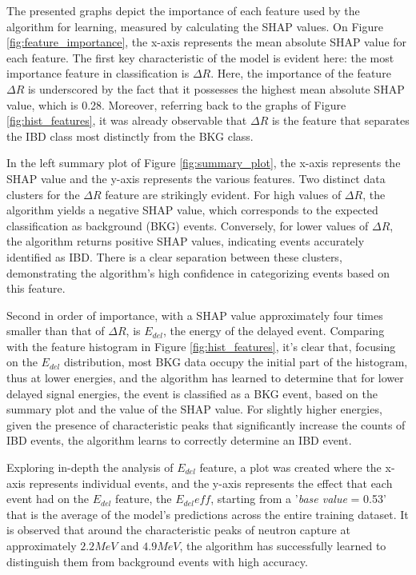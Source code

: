 The presented graphs depict the importance of each feature used by the algorithm for learning, measured by calculating the  SHAP values. On Figure \ref{fig:feature_importance}, the x-axis represents the mean absolute SHAP value for each feature. The first key characteristic of the model is evident here: the  most importance feature in classification is $\Delta R$. Here, the importance of the feature $\Delta R$ is underscored by the fact that it possesses the highest mean absolute SHAP value, which is 0.28. Moreover, referring back to the graphs of Figure \ref{fig:hist_features}, it was already observable that $\Delta R$ is the feature that separates the IBD class most distinctly from the BKG class. %

In the left summary plot of Figure \ref{fig:summary_plot}, the x-axis represents the SHAP value and the y-axis represents the various features. Two distinct data clusters for the \(\Delta R\) feature are strikingly evident. For high values of \(\Delta R\), the algorithm yields a negative SHAP value, which corresponds to the expected classification as background (BKG) events. Conversely, for lower values of \(\Delta R\), the algorithm returns positive SHAP values, indicating events accurately identified as IBD. There is a clear separation between these clusters, demonstrating the algorithm's high confidence in categorizing events based on this feature.

Second in order of importance, with a SHAP value approximately four times smaller than that of $\Delta R$, is $E_{del}$, the energy of the delayed event. Comparing with the feature histogram in Figure \ref{fig:hist_features}, it's clear that, focusing on the $E_{del}$ distribution, most BKG data occupy the initial part of the histogram, thus at lower energies, and the algorithm has learned to determine that for lower delayed signal energies, the event is classified as a BKG event, based on the summary plot and the value of the SHAP value. For slightly higher energies, given the presence of characteristic peaks that significantly increase the counts of IBD events, the algorithm learns to correctly determine an IBD event. 

Exploring in-depth the analysis of $E_{del}$ feature, a plot was created where the x-axis represents individual events, and the y-axis represents the effect that each event had on the $E_{del}$ feature, the $E_{del} eff$, starting from a '\textit{base value} = 0.53' that is the average of the model's predictions across the entire training dataset. It is observed that around the characteristic peaks of neutron capture at approximately $2.2 MeV$ and $4.9 MeV$, the algorithm has successfully learned to distinguish them from background events with high accuracy.


